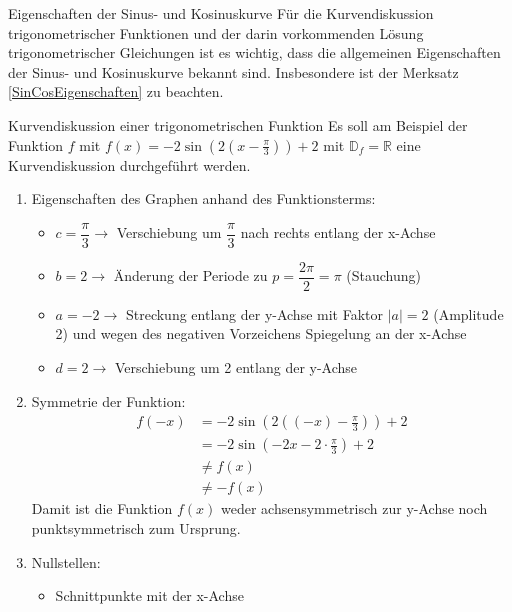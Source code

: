 \begin{b8d}{Eigenschaften der Sinus- und Kosinuskurve}{}
Für die Kurvendiskussion trigonometrischer Funktionen und der darin vorkommenden Lösung trigonometrischer Gleichungen ist es wichtig, dass die allgemeinen Eigenschaften der Sinus- und Kosinuskurve bekannt sind. Insbesondere ist der Merksatz \ref{SinCosEigenschaften} zu beachten.
\end{b8d}
\begin{bsp}{Kurvendiskussion einer trigonometrischen Funktion}{}
Es soll am Beispiel der Funktion $f$ mit $f(x) = -2\sin{(2(x-\frac{\pi}{3}))} +2$  mit $\mathds{D}_f = \mathds{R}$ eine Kurvendiskussion durchgeführt werden.
\begin{enumerate}
\item Eigenschaften des Graphen anhand des Funktionsterms:
\begin{itemize}
    \item $c=\dfrac{\pi}{3} \longrightarrow$ Verschiebung um $\dfrac{\pi}{3}$ nach rechts entlang der x-Achse
    \item $b=2 \longrightarrow$ Änderung der Periode zu $p= \dfrac{2\pi}{2} = \pi$ (Stauchung)
    \item $a = -2 \longrightarrow$ Streckung entlang der y-Achse mit Faktor $|a|=2$ (Amplitude 2) und wegen des negativen Vorzeichens Spiegelung an der x-Achse
    \item $d= 2 \longrightarrow $ Verschiebung um 2 entlang der y-Achse
\end{itemize}
    \item Symmetrie der Funktion:
    \begin{equation*}
        \begin{split}
            f(-x) &=  -2\sin{(2((-x)-\frac{\pi}{3}))} +2\\
            &=  -2\sin{(-2x-2\cdot \frac{\pi}{3})} +2\\
            &\neq f(x)\\
            &\neq -f(x)
        \end{split}
    \end{equation*}
    Damit ist die Funktion $f(x)$ weder achsensymmetrisch zur y-Achse noch punktsymmetrisch zum Ursprung.
    \item Nullstellen:\begin{itemize}
        \item Schnittpunkte mit der x-Achse
    \begin{equation*}
        \begin{split}

\end{split}
\end{equation*}
\end{itemize}
\end{enumerate}
\end{bsp}
